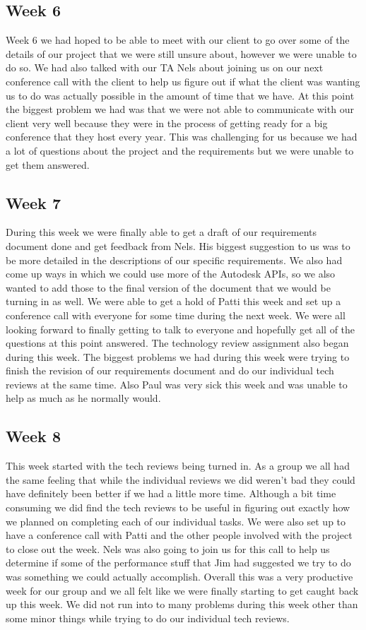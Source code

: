 \documentclass[10pt,draftclsnofoot,onecolumn]{IEEEtran}
\begin{document}
\subsection{Week 6}
Week 6 we had hoped to be able to meet with our client to go over some of the details of our project that we were still unsure about, however we were unable to do so. We had also talked with our TA Nels about joining us on our next conference call with the client to help us figure out if what the client was wanting us to do was actually possible in the amount of time that we have. At this point the biggest problem we had was that we were not able to communicate with our client very well because they were in the process of getting ready for a big conference that they host every year. This was challenging for us because we had a lot of questions about the project and the requirements but we were unable to get them answered.

\subsection{Week 7}
During this week we were finally able to get a draft of our requirements document done and get feedback from Nels. His biggest suggestion to us was to be more detailed in the descriptions of our specific requirements. We also had come up ways in which we could use more of the Autodesk APIs, so we also wanted to add those to the final version of the document that we would be turning in as well. We were able to get a hold of Patti this week and set up a conference call with everyone for some time during the next week. We were all looking forward to finally getting to talk to everyone and hopefully get all of the questions at this point answered. The technology review assignment also began during this week. The biggest problems we had during this week were trying to finish the revision of our requirements document and do our individual tech reviews at the same time. Also Paul was very sick this week and was unable to help as much as he normally would. 

\subsection{Week 8}
This week started with the tech reviews being turned in. As a group we all had the same feeling that while the individual reviews we did weren't bad they could have definitely been better if we had a little more time. Although a bit time consuming we did find the tech reviews to be useful in figuring out exactly how we planned on completing each of our individual tasks. We were also set up to have a conference call with Patti and the other people involved with the project to close out the week. Nels was also going to join us for this call to help us determine if some of the performance stuff that Jim had suggested we try to do was something we could actually accomplish. Overall this was a very productive week for our group and we all felt like we were finally starting to get caught back up this week. We did not run into to many problems during this week other than some minor things while trying to do our individual tech reviews. 
\end{document}
